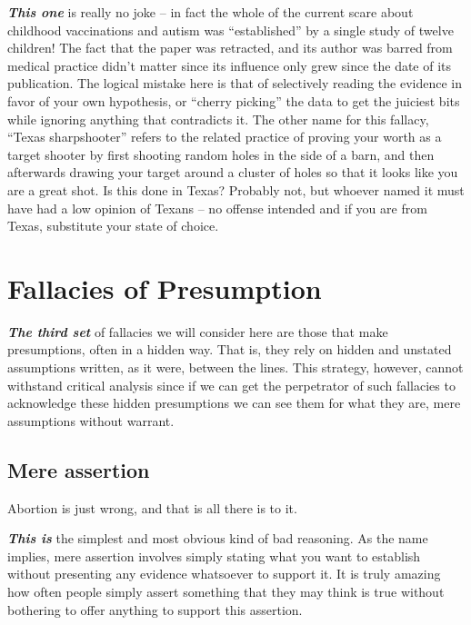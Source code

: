 \documentclass[]{book}
\makeatletter
\newenvironment{kframe}{%
\medskip{}
\setlength{\fboxsep}{.8em}
 \def\at@end@of@kframe{}%
 \ifinner\ifhmode%
  \def\at@end@of@kframe{\end{minipage}}%
  \begin{minipage}{\columnwidth}%
 \fi\fi%
 \def\FrameCommand##1{\hskip\@totalleftmargin \hskip-\fboxsep
 \colorbox{shadecolor}{##1}\hskip-\fboxsep
     \hskip-\linewidth \hskip-\@totalleftmargin \hskip\columnwidth}%
 \MakeFramed {\advance\hsize-\width
   \@totalleftmargin\z@ \linewidth\hsize
   \@setminipage}}%
 {\par\unskip\endMakeFramed%
 \at@end@of@kframe}
\newenvironment{rmdblock}[1]
  {
  \begin{itemize}
  \renewcommand{\labelitemi}{
    \raisebox{-.7\height}[0pt][0pt]{
      {\setkeys{Gin}{width=3em,keepaspectratio}\texttt{[image: img/\#1]}}
    }
  }
  \setlength{\fboxsep}{1em}
  \begin{kframe}
  \item
  }
  {
  \end{kframe}
  \end{itemize}
  }
\newenvironment{rmdwarning}
  {\begin{rmdblock}{warning}}
  {\end{rmdblock}}
\makeatother
\begin{document}
\textbf{\emph{This one}} is really no joke -- in fact the whole of the current scare about childhood vaccinations and autism was ``established'' by a single study of twelve children! The fact that the paper was retracted, and its author was barred from medical practice didn't matter since its influence only grew since the date of its publication. The logical mistake here is that of selectively reading the evidence in favor of your own hypothesis, or ``cherry picking'' the data to get the juiciest bits while ignoring anything that contradicts it. The other name for this fallacy, ``Texas sharpshooter'' refers to the related practice of proving your worth as a target shooter by first shooting random holes in the side of a barn, and then afterwards drawing your target around a cluster of holes so that it looks like you are a great shot. Is this done in Texas? Probably not, but whoever named it must have had a low opinion of Texans -- no offense intended and if you are from Texas, substitute your state of choice.

\hypertarget{fallacies-of-presumption}{%
\section{Fallacies of Presumption}\label{fallacies-of-presumption}}

\textbf{\emph{The third set}} of fallacies we will consider here are those that make presumptions, often in a hidden way. That is, they rely on hidden and unstated assumptions written, as it were, between the lines. This strategy, however, cannot withstand critical analysis since if we can get the perpetrator of such fallacies to acknowledge these hidden presumptions we can see them for what they are, mere assumptions without warrant.

\hypertarget{mere-assertion}{%
\subsection*{Mere assertion}\label{mere-assertion}}


\begin{rmdwarning}
Abortion is just wrong, and that is all there is to it.
\end{rmdwarning}

\textbf{\emph{This is}} the simplest and most obvious kind of bad reasoning. As the name implies, mere assertion involves simply stating what you want to establish without presenting any evidence whatsoever to support it. It is truly amazing how often people simply assert something that they may think is true without bothering to offer anything to support this assertion.
\end{document}
